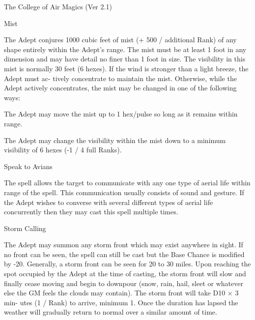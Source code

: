 \begin{Chapter}{The College of Air Magics (Ver 2.1)}
\begin{spell}[G-4]{Mist}

\begin{effects}
The Adept conjures 1000 cubic feet of mist (+ 500 / additional Rank)
of any shape entirely within the Adept’s range. The mist must be at
least 1 foot in any dimension and may have detail no finer than 1 foot
in size. The visibility in this mist is normally 30 feet (6 hexes).
If the wind is stronger than a light breeze, the Adept must ac- tively
concentrate to maintain the mist. Otherwise, while the Adept actively
concentrates, the mist may be changed in one of the following ways:
\begin{Enumerate}
\item The Adept may move the mist up to 1 hex/pulse so long as it
  remains within range.

\item The Adept may change the visibility within the mist down to a
  minimum visibility of 6 hexes (-1 / 4 full Ranks).
\end{Enumerate}
\end{effects}
\end{spell}

\begin{spell}[G-5]{Speak to Avians}

\begin{effects}
The spell allows the target to communicate with any one type of aerial
life within range of the spell.  This communication usually consists
of sound and gesture. If the Adept wishes to converse with several
different types of aerial life concurrently then they may cast this
spell multiple times.
\end{effects}
\end{spell}

\begin{spell}[G-6]{Storm Calling}

\begin{effects}
The Adept may summon any storm front which may exist anywhere in
sight. If no front can be seen, the spell can still be cast but the
Base Chance is modified by -20.  Generally, a storm front can be seen
for 20 to 30 miles. Upon reaching the spot occupied by the Adept at
the time of casting, the storm front will slow and finally cease
moving and begin to downpour (snow, rain, hail, sleet or whatever else
the GM feels the clouds may contain).  The storm front will take D10 ×
3 min- utes (1 / Rank) to arrive, minimum 1.  Once the duration has
lapsed the weather will gradually return to normal over a similar
amount of time.
\end{effects}
\end{spell}


\end{Chapter}
